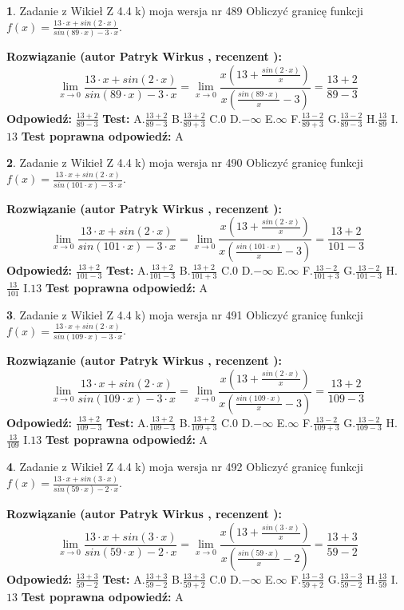 \documentclass[12pt, a4paper]{article}
\theoremstyle{definition} %
\newtheorem{zad}{}
\newcommand{\zadStart}[1]{\begin{zad}#1\newline}
\newcommand{\zadStop}{\end{zad}}
\newcommand{\rozwStart}[2]{\noindent \textbf{Rozwiązanie (autor #1 , recenzent #2): }\newline}
\newcommand{\rozwStop}{\newline}
\newcommand{\odpStart}{\noindent \textbf{Odpowiedź:}\newline}
\newcommand{\odpStop}{\newline}
\newcommand{\testStart}{\noindent \textbf{Test:}\newline}
\newcommand{\testStop}{\newline}
\newcommand{\kluczStart}{\noindent \textbf{Test poprawna odpowiedź:}\newline}
\newcommand{\kluczStop}{\newline}
\begin{document}
\zadStart{Zadanie z Wikieł Z 4.4 k) moja wersja nr 489}
Obliczyć granicę funkcji $f(x)=\frac{13\cdot x +sin(2\cdot x)}{sin(89\cdot x) -3\cdot x}$.
\zadStop
\rozwStart{Patryk Wirkus}{}
$$\lim\limits_{x\to 0}\frac{13\cdot x +sin(2\cdot x)}{sin(89\cdot x) -3\cdot x}
=\lim\limits_{x\to 0}\frac{x(13+\frac{sin(2\cdot x)}{x})}{x(\frac{sin(89\cdot x)}{x}-3)}
=\frac{13+2}{89-3}$$
\rozwStop
\odpStart
$\frac{13+2}{89-3}$
\odpStop
\testStart
A.$\frac{13+2}{89-3}$
B.$\frac{13+2}{89+3}$
C.$0$
D.$-\infty$
E.$\infty$
F.$\frac{13-2}{89+3}$
G.$\frac{13-2}{89-3}$
H.$\frac{13}{89}$
I.$13$
\testStop
\kluczStart
A
\kluczStop



\zadStart{Zadanie z Wikieł Z 4.4 k) moja wersja nr 490}
Obliczyć granicę funkcji $f(x)=\frac{13\cdot x +sin(2\cdot x)}{sin(101\cdot x) -3\cdot x}$.
\zadStop
\rozwStart{Patryk Wirkus}{}
$$\lim\limits_{x\to 0}\frac{13\cdot x +sin(2\cdot x)}{sin(101\cdot x) -3\cdot x}
=\lim\limits_{x\to 0}\frac{x(13+\frac{sin(2\cdot x)}{x})}{x(\frac{sin(101\cdot x)}{x}-3)}
=\frac{13+2}{101-3}$$
\rozwStop
\odpStart
$\frac{13+2}{101-3}$
\odpStop
\testStart
A.$\frac{13+2}{101-3}$
B.$\frac{13+2}{101+3}$
C.$0$
D.$-\infty$
E.$\infty$
F.$\frac{13-2}{101+3}$
G.$\frac{13-2}{101-3}$
H.$\frac{13}{101}$
I.$13$
\testStop
\kluczStart
A
\kluczStop



\zadStart{Zadanie z Wikieł Z 4.4 k) moja wersja nr 491}
Obliczyć granicę funkcji $f(x)=\frac{13\cdot x +sin(2\cdot x)}{sin(109\cdot x) -3\cdot x}$.
\zadStop
\rozwStart{Patryk Wirkus}{}
$$\lim\limits_{x\to 0}\frac{13\cdot x +sin(2\cdot x)}{sin(109\cdot x) -3\cdot x}
=\lim\limits_{x\to 0}\frac{x(13+\frac{sin(2\cdot x)}{x})}{x(\frac{sin(109\cdot x)}{x}-3)}
=\frac{13+2}{109-3}$$
\rozwStop
\odpStart
$\frac{13+2}{109-3}$
\odpStop
\testStart
A.$\frac{13+2}{109-3}$
B.$\frac{13+2}{109+3}$
C.$0$
D.$-\infty$
E.$\infty$
F.$\frac{13-2}{109+3}$
G.$\frac{13-2}{109-3}$
H.$\frac{13}{109}$
I.$13$
\testStop
\kluczStart
A
\kluczStop



\zadStart{Zadanie z Wikieł Z 4.4 k) moja wersja nr 492}
Obliczyć granicę funkcji $f(x)=\frac{13\cdot x +sin(3\cdot x)}{sin(59\cdot x) -2\cdot x}$.
\zadStop
\rozwStart{Patryk Wirkus}{}
$$\lim\limits_{x\to 0}\frac{13\cdot x +sin(3\cdot x)}{sin(59\cdot x) -2\cdot x}
=\lim\limits_{x\to 0}\frac{x(13+\frac{sin(3\cdot x)}{x})}{x(\frac{sin(59\cdot x)}{x}-2)}
=\frac{13+3}{59-2}$$
\rozwStop
\odpStart
$\frac{13+3}{59-2}$
\odpStop
\testStart
A.$\frac{13+3}{59-2}$
B.$\frac{13+3}{59+2}$
C.$0$
D.$-\infty$
E.$\infty$
F.$\frac{13-3}{59+2}$
G.$\frac{13-3}{59-2}$
H.$\frac{13}{59}$
I.$13$
\testStop
\kluczStart
A
\kluczStop
\end{document}
